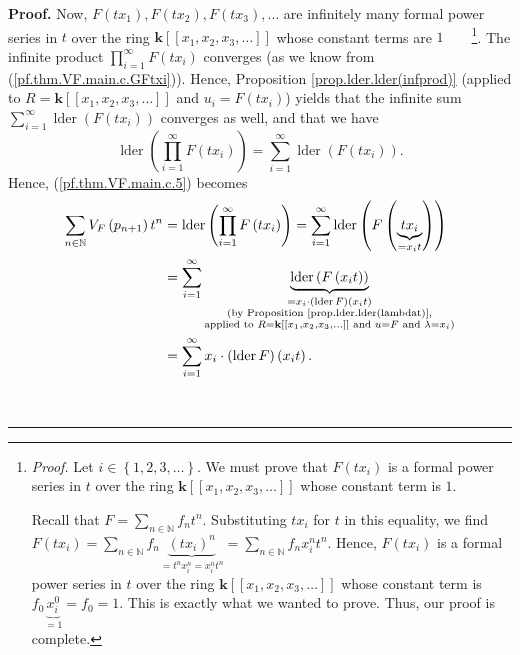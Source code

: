 \documentclass[numbers=enddot,12pt,final,onecolumn,notitlepage]{scrartcl}%
\theoremstyle{definition}
\newenvironment{proof}[1][Proof]{\noindent\textbf{#1.} }{\ \rule{0.5em}{0.5em}}
\let\sumnonlimits\sum
\let\prodnonlimits\prod
\renewcommand{\sum}{\sumnonlimits\limits}
\renewcommand{\prod}{\prodnonlimits\limits}
\newenvironment{verlong}{}{}
\begin{document}
\begin{verlong}
\begin{proof}
Now, $F\left(  tx_{1}\right)  ,F\left(  tx_{2}\right)  ,F\left(
tx_{3}\right)  ,\ldots$ are infinitely many formal power series in $t$ over
the ring $\mathbf{k}\left[  \left[  x_{1},x_{2},x_{3},\ldots\right]  \right]
$ whose constant terms are $1$\ \ \ \ \footnote{\textit{Proof.} Let
$i\in\left\{  1,2,3,\ldots\right\}  $. We must prove that $F\left(
tx_{i}\right)  $ is a formal power series in $t$ over the ring $\mathbf{k}%
\left[  \left[  x_{1},x_{2},x_{3},\ldots\right]  \right]  $ whose constant
term is $1$.
\par
Recall that $F=\sum_{n\in\mathbb{N}}f_{n}t^{n}$. Substituting $tx_{i}$ for $t$
in this equality, we find $F\left(  tx_{i}\right)  =\sum_{n\in\mathbb{N}}%
f_{n}\underbrace{\left(  tx_{i}\right)  ^{n}}_{=t^{n}x_{i}^{n}=x_{i}^{n}t^{n}%
}=\sum_{n\in\mathbb{N}}f_{n}x_{i}^{n}t^{n}$. Hence, $F\left(  tx_{i}\right)  $
is a formal power series in $t$ over the ring $\mathbf{k}\left[  \left[
x_{1},x_{2},x_{3},\ldots\right]  \right]  $ whose constant term is
$f_{0}\underbrace{x_{i}^{0}}_{=1}=f_{0}=1$. This is exactly what we wanted to
prove. Thus, our proof is complete.}. The infinite product $\prod
_{i=1}^{\infty}F\left(  tx_{i}\right)  $ converges (as we know from
(\ref{pf.thm.VF.main.c.GFtxi})). Hence, Proposition
\ref{prop.lder.lder(infprod)} (applied to $R=\mathbf{k}\left[  \left[
x_{1},x_{2},x_{3},\ldots\right]  \right]  $ and $u_{i}=F\left(  tx_{i}\right)
$) yields that the infinite sum $\sum_{i=1}^{\infty}\operatorname*{lder}%
\left(  F\left(  tx_{i}\right)  \right)  $ converges as well, and that we have%
\[
\operatorname*{lder}\left(  \prod_{i=1}^{\infty}F\left(  tx_{i}\right)
\right)  =\sum_{i=1}^{\infty}\operatorname*{lder}\left(  F\left(
tx_{i}\right)  \right)  .
\]
Hence, (\ref{pf.thm.VF.main.c.5}) becomes%
\begin{align}
\sum_{n\in\mathbb{N}}V_{F}\left(  p_{n+1}\right)  t^{n}  &
=\operatorname*{lder}\left(  \prod_{i=1}^{\infty}F\left(  tx_{i}\right)
\right)  =\sum_{i=1}^{\infty}\operatorname*{lder}\left(  F\left(
\underbrace{tx_{i}}_{=x_{i}t}\right)  \right) \nonumber\\
&  =\sum_{i=1}^{\infty}\underbrace{\operatorname*{lder}\left(  F\left(
x_{i}t\right)  \right)  }_{\substack{=x_{i}\cdot\left(  \operatorname*{lder}%
F\right)  \left(  x_{i}t\right)  \\\text{(by Proposition
\ref{prop.lder.lder(lambdat)},}\\\text{applied to }R=\mathbf{k}\left[  \left[
x_{1},x_{2},x_{3},\ldots\right]  \right]  \text{ and }u=F\text{ and }%
\lambda=x_{i}\text{)}}}\nonumber\\
&  =\sum_{i=1}^{\infty}x_{i}\cdot\left(  \operatorname*{lder}F\right)  \left(
x_{i}t\right)  . \label{pf.thm.VF.main.c.7}%
\end{align}



\end{proof}
\end{verlong}
\end{document}
